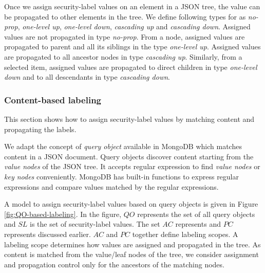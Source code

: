   


 Once we assign security-label values on an element in a JSON tree, the value can be propagated to other elements in the tree. We define following  types for \propagationControl{} as \textit{no-prop},  \textit{one-level up}, \textit{one-level down},  \textit{cascading up} and \textit{cascading down}. Assigned values are not propagated in type \textit{no-prop}. From a node, assigned values are propagated to parent and all its siblings in the type \textit{one-level up}. Assigned values are propagated to all ancestor nodes in type \textit{cascading up}. Similarly, from a selected item, assigned values are propagated to direct children in type \textit{one-level down} and to all descendants in type \textit{cascading down}. %
 
% 
 

\subsubsection{Content-based labeling}

  


This section shows how to assign security-label values by matching content and propagating the labels.

We adapt the concept of \textit{query object} available in MongoDB \cite{mongodb} which matches content in a JSON document. Query objects discover content starting from the \textit{value nodes} of the JSON tree. It accepts regular expression to find \textit{value nodes}  or \textit{key nodes} conveniently. MongoDB has built-in functions to express regular expressions and compare values matched by the regular expressions. 

A model to assign {security-label} values based on query objects is given in Figure \ref{fig:QO-based-labeling}. In the figure, $QO$ represents the set of all query objects and $SL$ is the set of {security-label} values. The set $AC$ represents \assignmentControl{} and $PC$ represents \propagationControl{} discussed earlier.  $AC$ and $PC$ together define labeling scopes. A labeling scope determines how values are assigned and propagated in the tree. As content is matched from the value/leaf nodes of the tree, we consider assignment and propagation control only for the ancestors of the matching nodes.

